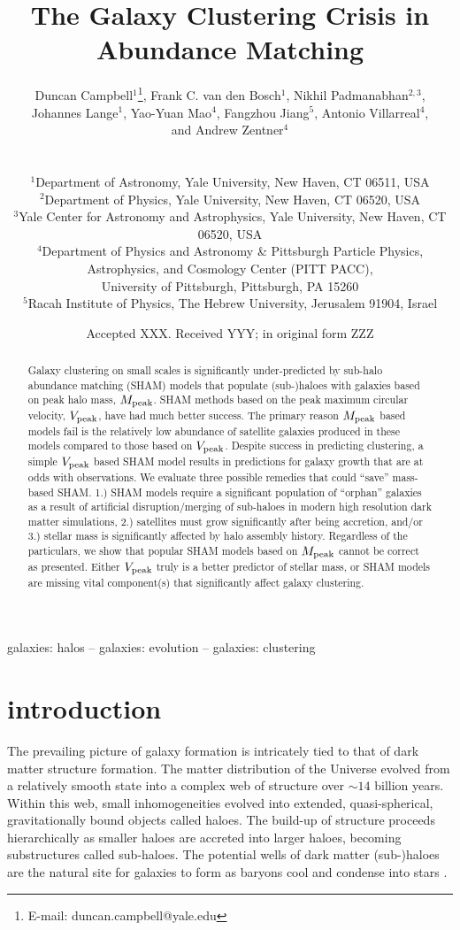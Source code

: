 \documentclass[a4paper,fleqn,usenatbib]{mnras}
\title[The Galaxy Clustering Crisis]{The Galaxy Clustering Crisis in Abundance Matching}
\author[Campbell et al.]
{\parbox[t]{\textwidth}{
Duncan Campbell$^{1}$\thanks{E-mail: duncan.campbell@yale.edu},
Frank C. van den Bosch$^{1}$,
Nikhil Padmanabhan$^{2, 3}$,\\ 
Johannes Lange$^{1}$,
Yao-Yuan Mao$^{4}$, 
Fangzhou Jiang$^{5}$,
Antonio Villarreal$^{4}$,\\
and Andrew Zentner$^{4}$
} \\
\vspace*{3pt} \\
$^{1}$Department of Astronomy, Yale University, New Haven, CT 06511, USA\\
$^{2}$Department of Physics, Yale University, New Haven, CT 06520, USA \\
$^{3}$Yale Center for Astronomy and Astrophysics, Yale University, New Haven, CT 06520, USA\\
$^{4}$Department of Physics and Astronomy \& Pittsburgh Particle Physics, Astrophysics, and Cosmology Center (PITT PACC),\\ University of Pittsburgh, Pittsburgh, PA 15260\\
$^{5}$Racah Institute of Physics, The Hebrew University, Jerusalem 91904, Israel
}
\date{Accepted XXX. Received YYY; in original form ZZZ}
\begin{document}
\label{firstpage}
\pagerange{\pageref{firstpage}--\pageref{lastpage}}
\maketitle

\begin{abstract}
Galaxy clustering on small scales is significantly under-predicted by sub-halo abundance matching (SHAM) models that populate (sub-)haloes with galaxies based on peak halo mass, $M_{\rm peak}$.  SHAM methods based on the peak maximum circular velocity, $V_{\rm peak}$, have had much better success.  The primary reason $M_{\rm peak}$ based models fail is the relatively low abundance of satellite galaxies produced in these models compared to those based on $V_{\rm peak}$.  Despite success in predicting clustering, a simple $V_{\rm peak}$ based SHAM model results in predictions for galaxy growth that are at odds with observations.  We evaluate three possible remedies that could ``save'' mass-based SHAM.  1.) SHAM models require a significant population of ``orphan'' galaxies as a result of artificial disruption/merging of sub-haloes in modern high resolution dark matter simulations, 2.) satellites must grow significantly after being accretion, and/or 3.) stellar mass is significantly affected by halo assembly history.  Regardless of the particulars, we show that popular SHAM models based on $M_{\rm peak}$ cannot be correct as presented.  Either $V_{\rm peak}$ truly is a better predictor of stellar mass, or SHAM models are missing vital component(s) that significantly affect galaxy clustering.
\end{abstract}

\begin{keywords}
galaxies: halos -- galaxies: evolution -- galaxies: clustering
\end{keywords}

\section{introduction}

The prevailing picture of galaxy formation is intricately tied to that of dark matter structure formation.  The matter distribution of the Universe evolved from a relatively smooth state into a complex web of structure over $\sim 14$ billion years.  Within this web, small inhomogeneities evolved into extended, quasi-spherical, gravitationally bound objects called haloes.  The build-up of structure proceeds hierarchically as smaller haloes are accreted into larger haloes, becoming substructures called sub-haloes.  The potential wells of dark matter (sub-)haloes are the natural site for galaxies to form as baryons cool and condense into stars \citep{Rees:1977gr, White:1978uk, Fall:1980br}.  
\end{document}
